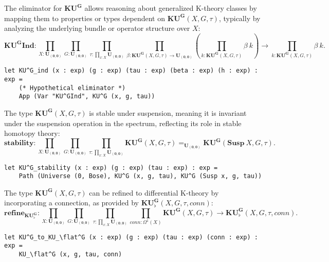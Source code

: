 \documentclass{article}
\begin{document}
\begin{definition}[KU$^G$-Elimination]
The eliminator for $\mathbf{KU^G}$ allows reasoning about
generalized K-theory classes by mapping them to properties
or types dependent on $\mathbf{KU^G}(X, G, \tau)$, typically
by analyzing the underlying bundle or operator structure over $X$:
\[
\mathbf{KU^GInd} :
\prod_{X : \mathbf{U_{(0,0)}}} \prod_{G : \mathbf{U_{(0,0)}}} \prod_{\tau : \prod_{x : X} \mathbf{U_{(0,0)}}} \prod_{\beta : \mathbf{KU^G}(X, G, \tau) \to \mathbf{U_{(0,0)}}} 
\left( \prod_{k : \mathbf{KU^G}(X, G, \tau)} \beta\ k \right) \to
\prod_{k : \mathbf{KU^G}(X, G, \tau)} \beta\ k.
\]
\begin{lstlisting}[mathescape=true]
let KU^G_ind (x : exp) (g : exp) (tau : exp) (beta : exp) (h : exp) : exp =
    (* Hypothetical eliminator *)
    App (Var "KU^GInd", KU^G (x, g, tau))
\end{lstlisting}
\end{definition}

\begin{theorem}
The type $\mathbf{KU^G}(X, G, \tau)$ is stable under suspension,
meaning it is invariant under the suspension operation in the spectrum,
reflecting its role in stable homotopy theory:
\[
\mathbf{stability} :
\prod_{X : \mathbf{U_{(0,0)}}} \prod_{G : \mathbf{U_{(0,0)}}} \prod_{\tau : \prod_{x : X} \mathbf{U_{(0,0)}}} \mathbf{KU^G}(X, G, \tau) =_{\mathbf{U_{(0,0)}}} \mathbf{KU^G}(\mathbf{Susp}\ X, G, \tau).
\]
\begin{lstlisting}[mathescape=true]
let KU^G_stability (x : exp) (g : exp) (tau : exp) : exp =
    Path (Universe (0, Bose), KU^G (x, g, tau), KU^G (Susp x, g, tau))
\end{lstlisting}
\end{theorem}

\begin{theorem}
The type $\mathbf{KU^G}(X, G, \tau)$ can be refined to differential K-theory by incorporating a connection, as provided by $\mathbf{KU_\flat^G}(X, G, \tau, conn)$:
\[
\mathbf{refine}_{\mathbf{KU_\flat^G}} :
\prod_{X : \mathbf{U_{(0,0)}}} \prod_{G : \mathbf{U_{(0,0)}}} \prod_{\tau : \prod_{x : X} \mathbf{U_{(0,0)}}} \prod_{conn : \Omega^{1}(X)} \mathbf{KU^G}(X, G, \tau) \to \mathbf{KU_\flat^G}(X, G, \tau, conn).
\]
\begin{lstlisting}[mathescape=true]
let KU^G_to_KU_\flat^G (x : exp) (g : exp) (tau : exp) (conn : exp) : exp =
    KU_\flat^G (x, g, tau, conn)
\end{lstlisting}
\end{theorem}
\end{document}
